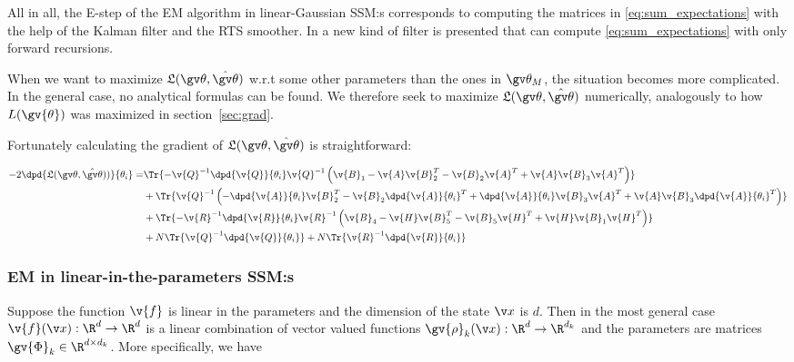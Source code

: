 All in all, the E-step of the 
EM algorithm in linear-Gaussian SSM:s corresponds to computing
the matrices in \eqref{eq:sum_expectations} with the help of the Kalman filter and
the RTS smoother. In \parencite{Elliott1999} a new kind of filter is presented that
can compute \eqref{eq:sum_expectations} with only forward recursions. 


\cite{Wills2011}
When we want to maximize $\Lb(\Th,\hat{\Th})$ w.r.t some other
parameters than the ones in $\Th_M$, the situation becomes more complicated.
In the general case, no analytical formulas can be found. We therefore seek
to maximize $\Lb(\Th,\hat{\Th})$ numerically, analogously to how $L(\gv{\theta})$
was maximized in section~\ref{sec:grad}.

Fortunately calculating the gradient of $\Lb(\Th,\hat{\Th})$ is straightforward:

\begin{align}
\begin{split}
	-2\dpd{\Lb(\Th,\hat{\Th}))}{\theta_i}
	=&\Tr{-\v{Q}^{-1}\dpd{\v{Q}}{\theta_i}\v{Q}^{-1}
	\left(\v{B}_1-\v{A}\v{B}_2^T-\v{B}_2\v{A}^T+\v{A}\v{B}_3\v{A}^T\right)}\\
	&+\Tr{\v{Q}^{-1}\left(-\dpd{\v{A}}{\theta_i}\v{B}_2^T-\v{B}_2\dpd{\v{A}}{\theta_i}^T+\dpd{\v{A}}{\theta_i}\v{B}_3\v{A}^T+\v{A}\v{B}_3\dpd{\v{A}}{\theta_i}^T\right)}\\
	&+\Tr{-\v{R}^{-1}\dpd{\v{R}}{\theta_i}\v{R}^{-1}
	\left(\v{B}_4-\v{H}\v{B}_5^T-\v{B}_5\v{H}^T+\v{H}\v{B}_1\v{H}^T\right)}\\
	&+N\Tr{\v{Q}^{-1}\dpd{\v{Q}}{\theta_i}}
	+N\Tr{\v{R}^{-1}\dpd{\v{R}}{\theta_i}}\\
	\label{eq:dLB}
\end{split}
\end{align}


\subsubsection{EM in linear-in-the-parameters SSM:s}%
\label{sec:litp}

Suppose the function $\v{f}$ is linear in the parameters and the dimension of the state $\x$ is $d$.
Then in the most general case $\v{f}(\x):\R^d\to\R^d$ is a linear
combination of vector valued functions $\gv{\rho}_k(\x):\R^d\to\R^{d_k}$  
and the parameters are matrices $\gv{\Phi}_k\in\R^{d\times d_k}$. More specifically,
we have

